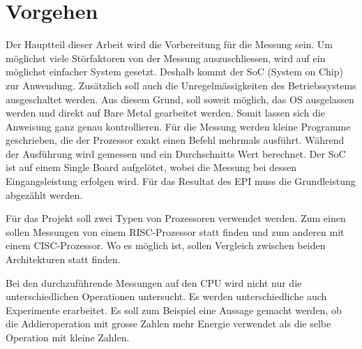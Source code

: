 \chapter{Vorgehen}

Der Hauptteil dieser Arbeit wird die Vorbereitung für die Messung sein. Um möglichst viele Störfaktoren
von der Messung auszuschliessen, wird auf ein möglichst einfacher System gesetzt. Deshalb kommt der  SoC
(System on Chip) zur Anwendung. Zusätzlich soll auch die Unregelmässigkeiten des Betriebssystems ausgeschaltet
werden. Aus diesem Grund, soll soweit möglich, das OS ausgelassen werden und direkt auf Bare Metal gearbeitet werden.
Somit lassen sich die Anweisung ganz genau kontrollieren. Für die Messung werden kleine Programme geschrieben, die der Prozessor
exakt einen Befehl mehrmals ausführt. Während der Ausführung wird gemessen und ein Durchschnitts Wert berechnet.
Der SoC ist auf einem Single Board aufgelötet, wobei
die Messung bei dessen Eingangsleistung erfolgen wird. Für das Resultat des EPI muss die Grundleistung abgezählt
werden.
\par
Für das Projekt soll zwei Typen von Prozessoren verwendet werden. Zum einen sollen Messungen von einem RISC-Prozessor
statt finden und zum anderen mit einem CISC-Prozessor. Wo es möglich ist, sollen Vergleich zwischen beiden
Architekturen statt finden.
\par
Bei den durchzuführende Messungen auf den CPU wird nicht nur die unterschiedlichen Operationen untersucht. Es werden 
unterschiedliche auch Experimente erarbeitet. Es soll zum Beispiel eine Aussage gemacht werden, ob die Addieroperation
mit grosse Zahlen mehr Energie verwendet als die selbe Operation mit kleine Zahlen.


